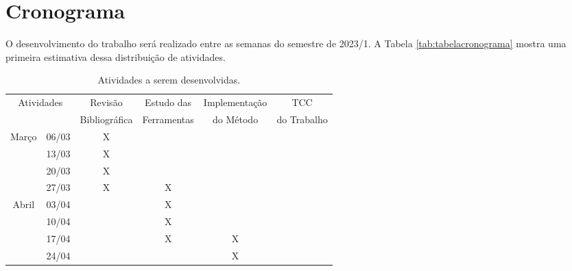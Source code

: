 \chapter{Cronograma}\label{cap:cronograma}

O desenvolvimento do trabalho será realizado entre as semanas do semestre de 2023/1. A Tabela \ref{tab:tabelacronograma} mostra uma primeira estimativa dessa distribuição de atividades.

\begin{table}[h]
    \caption{Atividades a serem desenvolvidas.}
    \centering
    \begin{tabular}{|cc|c|c|c|c|}
        \hline
        \multicolumn{2}{|c|}{Atividades}             & Revisão       & Estudo das  & Implementação & TCC             \\
        \multicolumn{2}{|c|}{}                       & Bibliográfica & Ferramentas & do Método     & do Trabalho     \\ \hline
        \multicolumn{1}{|c|}{\multirow{4}{*}{Março}} & 06/03         & X           &               &             &   \\ \cline{2-6}
        \multicolumn{1}{|c|}{}                       & 13/03         & X           &               &             &   \\ \cline{2-6}
        \multicolumn{1}{|c|}{}                       & 20/03         & X           &               &             &   \\ \cline{2-6}
        \multicolumn{1}{|c|}{}                       & 27/03         & X           & X             &             &   \\ \hline
        \multicolumn{1}{|c|}{\multirow{4}{*}{Abril}} & 03/04         &             & X             &             &   \\ \cline{2-6}
        \multicolumn{1}{|c|}{}                       & 10/04         &             & X             &             &   \\ \cline{2-6}
        \multicolumn{1}{|c|}{}                       & 17/04         &             & X             & X           &   \\ \cline{2-6}
        \multicolumn{1}{|c|}{}                       & 24/04         &             &               & X           &   \\ \hline

\end{tabular}
\end{table}
